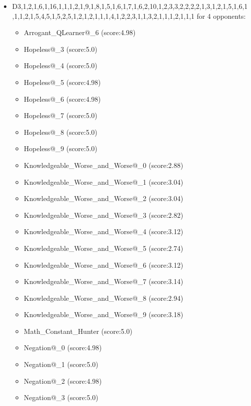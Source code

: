 \begin{appendices}
\begin{itemize}
        \item D3,1,2,1,6,1,16,1,1,1,2,1,9,1,8,1,5,1,6,1,7,1,6,2,10,1,2,3,3,2,2,2,2,1,3,1,2,1,5,1,6,1,1,1,2,1,5,4,5,1,5,2,5,1,2,1,2,1,1,1,4,1,2,2,3,1,1,3,2,1,1,1,2,1,1,1 for 4 opponents:
        \begin{multicols}{3}
            \begin{itemize}
                \item Arrogant\_QLearner@\_6 (score:4.98)
                \item Hopeless@\_3 (score:5.0)
                \item Hopeless@\_4 (score:5.0)
                \item Hopeless@\_5 (score:4.98)
                \item Hopeless@\_6 (score:4.98)
                \item Hopeless@\_7 (score:5.0)
                \item Hopeless@\_8 (score:5.0)
                \item Hopeless@\_9 (score:5.0)
                \item Knowledgeable\_Worse\_and\_Worse@\_0 (score:2.88)
                \item Knowledgeable\_Worse\_and\_Worse@\_1 (score:3.04)
                \item Knowledgeable\_Worse\_and\_Worse@\_2 (score:3.04)
                \item Knowledgeable\_Worse\_and\_Worse@\_3 (score:2.82)
                \item Knowledgeable\_Worse\_and\_Worse@\_4 (score:3.12)
                \item Knowledgeable\_Worse\_and\_Worse@\_5 (score:2.74)
                \item Knowledgeable\_Worse\_and\_Worse@\_6 (score:3.12)
                \item Knowledgeable\_Worse\_and\_Worse@\_7 (score:3.14)
                \item Knowledgeable\_Worse\_and\_Worse@\_8 (score:2.94)
                \item Knowledgeable\_Worse\_and\_Worse@\_9 (score:3.18)
                \item Math\_Constant\_Hunter (score:5.0)
                \item Negation@\_0 (score:4.98)
                \item Negation@\_1 (score:5.0)
                \item Negation@\_2 (score:4.98)
                \item Negation@\_3 (score:5.0)

\end{itemize}
\end{multicols}
\end{itemize}
\end{appendices}
